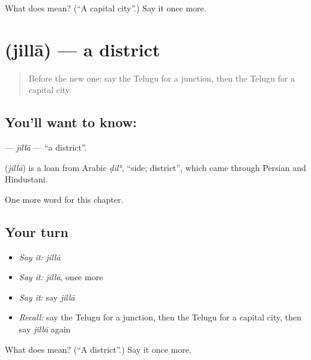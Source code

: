 \begin{tcolorbox}[breakable,colback=teal!4,colframe=teal!35!black,title={Before you move on}]
What does  mean? (\textquotedblleft{}A capital city\textquotedblright{}.) Say it once more.
\end{tcolorbox}
\section[\texorpdfstring{\te{జిల్లా} (jillā)}{జిల్లా (jillā)}]{ (jillā) — a district}

\label{lesson:TE-C214-jilla}



\begin{quote}
Before the new one: say the Telugu for a junction, then the Telugu for a capital city.
\end{quote}

\subsection*{You'll want to know: }
\textbf{} — \emph{jillā} — \textquotedblleft{}a district\textquotedblright{}.

\begin{cousinweb}
\textbf{} (\emph{jillā}) is a loan from Arabic \emph{ḍilʿ}, \textquotedblleft{}side; district\textquotedblright{}, which came through Persian and Hindustani.
\end{cousinweb}

\begin{grammarlens}[title={What you've built}]
One more word for this chapter.
\end{grammarlens}

\subsection*{Your turn}
\begin{itemize}
\raggedright
  \item \emph{Say it:} \emph{jillā}
  \item \emph{Say it:} \emph{jillā}, once more
  \item \emph{Say it:} say \emph{jillā}
  \item \emph{Recall:} say the Telugu for a junction, then the Telugu for a capital city, then say \emph{jillā} again
\end{itemize}

\begin{tcolorbox}[breakable,colback=teal!4,colframe=teal!35!black,title={Before you move on}]
What does  mean? (\textquotedblleft{}A district\textquotedblright{}.) Say it once more.
\end{tcolorbox}
